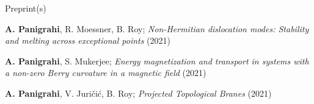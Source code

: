 

\begin{cventries}

  \cventry
    {Preprint(s)} %
    {} %
    {} %
    {} %
    {
      \begin{cvitems} %
      	\item{\textbf{A. Panigrahi}, R. Moessner, B. Roy; \textit{Non-Hermitian dislocation modes: Stability and melting across exceptional points} (2021) }
      	\item{\textbf{A. Panigrahi}, S. Mukerjee; \textit{Energy magnetization and transport in systems with a non-zero Berry curvature in a magnetic field} (2021)
      	}
        \item{\textbf{A. Panigrahi}, V. Juri\v{c}i\'c, B. Roy; \textit{Projected Topological Branes} (2021)}
      \end{cvitems}
    }
\end{cventries}
